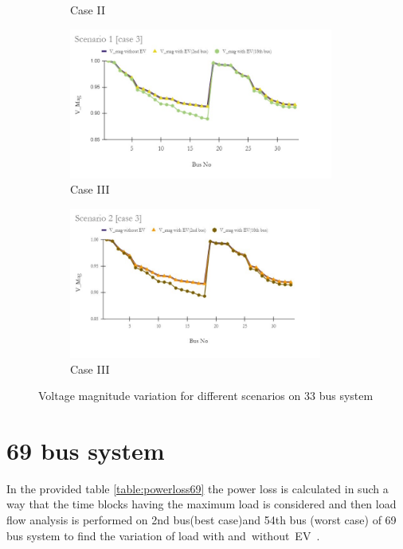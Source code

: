 \begin{figure}[!h]
\begin{subfigure}{.5\textwidth}
 				\caption{Case II}
 				\label{fig:LF2b}
 			\end{subfigure}
 			\begin{subfigure}{.5\textwidth}
 				\centering
 				\includegraphics[width=.97\linewidth,height= 4.95cm]{./Figures/sc1_case3}
 				\caption{Case III}
 				\label{fig:LFc}
 			\end{subfigure}
 			\begin{subfigure}{.5\textwidth}
 				\centering
 				\includegraphics[width=.97\linewidth,height= 4.95cm]{./Figures/sc2_case3}
 				\caption{Case III}
 				\label{fig:LF2c}
 			\end{subfigure}
 			\caption{ Voltage magnitude variation for different scenarios on 33 bus system }
 			\label{fig:loadprofile33}
 		\end{figure} 
 		
		
	



	\section{69 bus system}
In the provided table \ref{table:powerloss69} the power loss is calculated in such a way that the time blocks having the maximum load  is considered and then load flow analysis is performed on 2nd bus(best case)and 54th bus (worst case) of 69 bus system to find the variation of load with and without EV .


